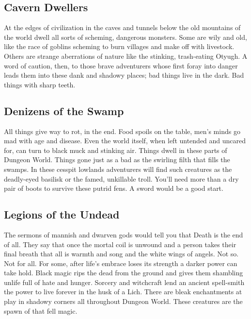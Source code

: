        
\subsection{Cavern Dwellers}    
       

At the edges of civilization in the caves and tunnels below the old mountains of the world dwell all sorts of scheming, dangerous monsters. Some are wily and old, like the race of goblins scheming to burn villages and make off with livestock. Others are strange aberrations of nature like the stinking, trash-eating Otyugh. A word of caution, then, to those brave adventurers whose first foray into danger leads them into these dank and shadowy places; bad things live in the dark. Bad things with sharp teeth.

       
\subsection{Denizens of the Swamp}    
       

All things give way to rot, in the end. Food spoils on the table, men's minds go mad with age and disease. Even the world itself, when left untended and uncared for, can turn to black muck and stinking air. Things dwell in these parts of Dungeon World. Things gone just as a bad as the swirling filth that fills the swamps. In these cesspit lowlands adventurers will find such creatures as the deadly-eyed basilisk or the famed, unkillable troll. You'll need more than a dry pair of boots to survive these putrid fens. A sword would be a good start.

       
\subsection{Legions of the Undead}    
       

The sermons of mannish and dwarven gods would tell you that Death is the end of all. They say that once the mortal coil is unwound and a person takes their final breath that all is warmth and song and the white wings of angels. Not so. Not for all. For some, after life's embrace loses its strength a darker power can take hold. Black magic rips the dead from the ground and gives them shambling unlife full of hate and hunger. Sorcery and witchcraft lend an ancient spell-smith the power to live forever in the husk of a Lich. There are bleak enchantments at play in shadowy corners all throughout Dungeon World. These creatures are the spawn of that fell magic.

